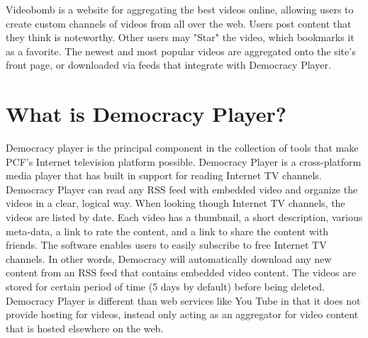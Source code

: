 \documentclass[a4paper,12pt]{report}
\begin{document}
Videobomb is a website for aggregating the best videos online, allowing users to create custom channels of videos from all over the web.
Users post content that they think is noteworthy.
Other users may "Star" the video, which bookmarks it as a favorite.
The newest and most popular videos are aggregated onto the site's front page, or downloaded via feeds that integrate with Democracy Player. 

\section{What is Democracy Player?}
Democracy player is the principal component in the collection of tools that make PCF's Internet television platform possible.
Democracy Player is a cross-platform media player that has built in support for reading Internet TV channels.
Democracy Player can read any RSS feed with embedded video and organize the videos in a clear, logical way.
When looking though Internet TV channels, the videos are listed by date.
Each video has a thumbnail, a short description, various meta-data, a link to rate the content, and a link to share the content with friends.
The software enables users to easily subscribe to free Internet TV channels.
In other words, Democracy will automatically download any new content from an RSS feed that contains embedded video content.
The videos are stored for certain period of time (5 days by default) before being deleted.
Democracy Player is different than web services like You Tube in that it does not provide hosting for videos, instead only acting as an aggregator for video content that is hosted elsewhere on the web.
\end{document}
